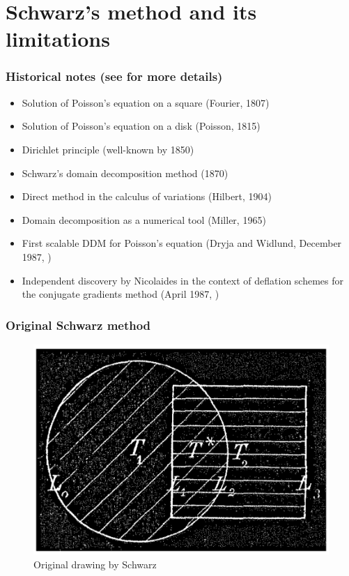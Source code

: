 \documentclass{beamer}
\begin{document}
\section{Schwarz's method and its limitations}
\begin{frame}
\frametitle{Historical notes (see \cite{gander} for more details)}
\begin{itemize}%
\item Solution of Poisson's equation on a square (Fourier, 1807)
\item Solution of Poisson's equation on a disk (Poisson, 1815)
\item Dirichlet principle (well-known by 1850)
\item Schwarz's domain decomposition method (1870)
\item Direct method in the calculus of variations (Hilbert, 1904)
\item Domain decomposition as a numerical tool (Miller, 1965)
\item First scalable DDM for Poisson's equation
	(Dryja and Widlund, December 1987, \cite{widlund})
\item Independent discovery by Nicolaides in the context
	of deflation schemes for the conjugate gradients method
	(April 1987, \cite{nicolaides})
\end{itemize}
\end{frame}

\begin{frame}
\frametitle{Original Schwarz method}
\begin{figure}[h]
	\includegraphics[scale=1.8]{original-drawing.png}
	\caption*{Original drawing by Schwarz} %
\end{figure}
\end{frame}
\end{document}
